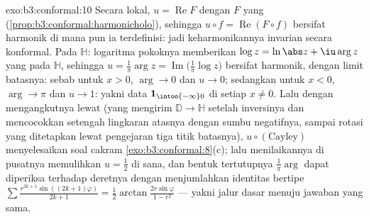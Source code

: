 \begin{solution}{exo:b3:conformal:10}
Secara lokal, $u = \operatorname{Re}F$ dengan $F$ yang 
(\cref{prop:b3:conformal:harmonicholo}), sehingga $u\circ f =
\operatorname{Re}(F\circ f)$ bersifat harmonik di mana pun ia terdefinisi:
jadi keharmonikannya invarian secara konformal. Pada $\mathbb H$: logaritma
pokoknya memberikan $\log z = \ln\abs z + \iu\arg z$ yang
 pada $\mathbb H$, sehingga $u = \frac1\pi\arg z =
\operatorname{Im}\bigl(\frac1\pi\log z\bigr)$ bersifat harmonik,
dengan limit batasnya: sebab untuk $x > 0$, $\arg \to 0$ dan $u \to 0$;
sedangkan untuk $x < 0$, $\arg \to \pi$ dan $u \to 1$: yakni data $\mathbf
1_{\intoo{-\infty}0}$ di setiap $x \neq 0$. Lalu dengan mengangkutnya lewat
 (yang mengirim $\mathbb D \to \mathbb H$ setelah
inversinya dan mencocokkan setengah lingkaran atasnya dengan sumbu
negatifnya, sampai rotasi yang ditetapkan lewat pengejaran tiga titik
batasnya), $u\circ(\text{Cayley})$ menyelesaikan soal cakram
\cref{exo:b3:conformal:8}(c); lalu menilaikannya di pusatnya
memulihkan $u = \frac12$ di sana, dan bentuk tertutupnya
$\frac1\pi\arg$ dapat diperiksa terhadap deretnya dengan menjumlahkan
identitas bertipe $\sum\frac{r^{2k+1}\sin((2k+1)\varphi)}{2k+1} =
\frac12\arctan\frac{2r\sin\varphi}{1 - r^2}$
--- yakni jalur dasar menuju jawaban yang sama.
\end{solution}

